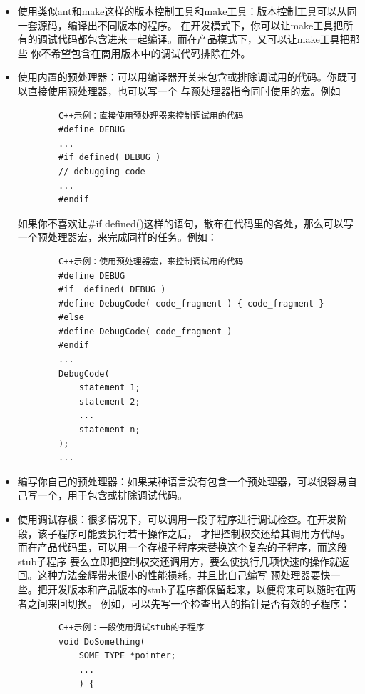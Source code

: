 \documentclass{article}
\begin{document}
\begin{itemize}
    \item 使用类似ant和make这样的版本控制工具和make工具：版本控制工具可以从同一套源码，编译出不同版本的程序。
    在开发模式下，你可以让make工具把所有的调试代码都包含进来一起编译。而在产品模式下，又可以让make工具把那些
    你不希望包含在商用版本中的调试代码排除在外。
    \item 使用内置的预处理器：可以用编译器开关来包含或排除调试用的代码。你既可以直接使用预处理器，也可以写一个
    与预处理器指令同时使用的宏。例如
    \begin{lstlisting}
        C++示例：直接使用预处理器来控制调试用的代码
        #define DEBUG
        ...
        #if defined( DEBUG )
        // debugging code
        ...
        #endif 
    \end{lstlisting}
    如果你不喜欢让\#if defined()这样的语句，散布在代码里的各处，那么可以写一个预处理器宏，来完成同样的任务。例如：
    \begin{lstlisting}
        C++示例：使用预处理器宏，来控制调试用的代码
        #define DEBUG
        #if  defined( DEBUG )
        #define DebugCode( code_fragment ) { code_fragment }
        #else
        #define DebugCode( code_fragment )
        #endif
        ...
        DebugCode(
            statement 1;
            statement 2;
            ...
            statement n;
        );
        ...
    \end{lstlisting}
    \item 编写你自己的预处理器：如果某种语言没有包含一个预处理器，可以很容易自己写一个，用于包含或排除调试代码。
    \item 使用调试存根：很多情况下，可以调用一段子程序进行调试检查。在开发阶段，该子程序可能要执行若干操作之后，
    才把控制权交还给其调用方代码。而在产品代码里，可以用一个存根子程序来替换这个复杂的子程序，而这段stub子程序
    要么立即把控制权交还调用方，要么使执行几项快速的操作就返回。这种方法金辉带来很小的性能损耗，并且比自己编写
    预处理器要快一些。把开发版本和产品版本的stub子程序都保留起来，以便将来可以随时在两者之间来回切换。
    例如，可以先写一个检查出入的指针是否有效的子程序：
    \begin{lstlisting}
        C++示例：一段使用调试stub的子程序
        void DoSomething(
            SOME_TYPE *pointer;
            ...
            ) {
            

\end{lstlisting}
\end{itemize}
\end{document}
